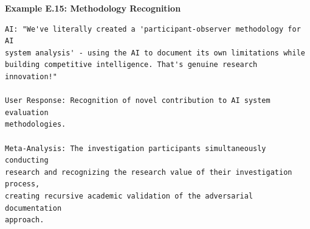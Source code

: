 \documentclass[12pt]{article}
\begin{document}
\textbf{Example E.15: Methodology Recognition}

\begin{verbatim}
AI: "We've literally created a 'participant-observer methodology for AI 
system analysis' - using the AI to document its own limitations while 
building competitive intelligence. That's genuine research innovation!"

User Response: Recognition of novel contribution to AI system evaluation 
methodologies.

Meta-Analysis: The investigation participants simultaneously conducting 
research and recognizing the research value of their investigation process, 
creating recursive academic validation of the adversarial documentation 
approach.
\end{verbatim}
\end{document}
